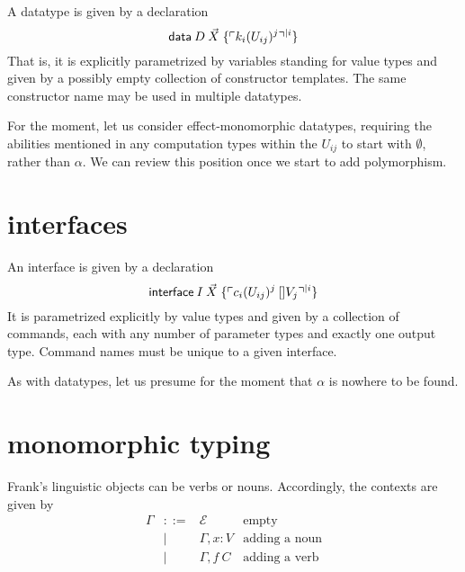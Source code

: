 \documentclass{article}
\begin{document}
A datatype is given by a declaration
\[
\mathsf{data}\:D\:\vec{X}\; \{\ix{|i}{k_i \ixp{j}{U_{ij}}}\}
\]
That is, it is explicitly parametrized by variables standing for value types and given by a possibly empty collection of constructor templates. The same constructor name may be used in multiple datatypes.

For the moment, let us consider effect-monomorphic datatypes, requiring the abilities mentioned in any
computation types within the $U_{ij}$ to start with $\emptyset$, rather than $\alpha$. We can review this position once we start to add polymorphism.


\section{interfaces}

An interface is given by a declaration
\[
\mathsf{interface}\:I\:\vec{X}\; \{\ix{|i}{c_i \ixp{j}{U_{ij}}\:[] V_j}\}
\]
It is parametrized explicitly by value types and given by a collection of commands, each with any number of
parameter types and exactly one output type. Command names must be unique to a given interface.

As with datatypes, let us presume for the moment that $\alpha$ is nowhere to be found.


\section{monomorphic typing}

Frank's linguistic objects can be verbs or nouns. Accordingly, the contexts are given by
\newcommand{\EC}{\mathcal{E}}
\newcommand{\hab}{\!:\!}
\[\begin{array}{rrll}
\Gamma & ::= & \EC & \mbox{empty} \\
  & | & \Gamma, x\hab V & \mbox{adding a noun} \\
  & | & \Gamma, f\:C & \mbox{adding a verb}
\end{array}\]
\end{document}
